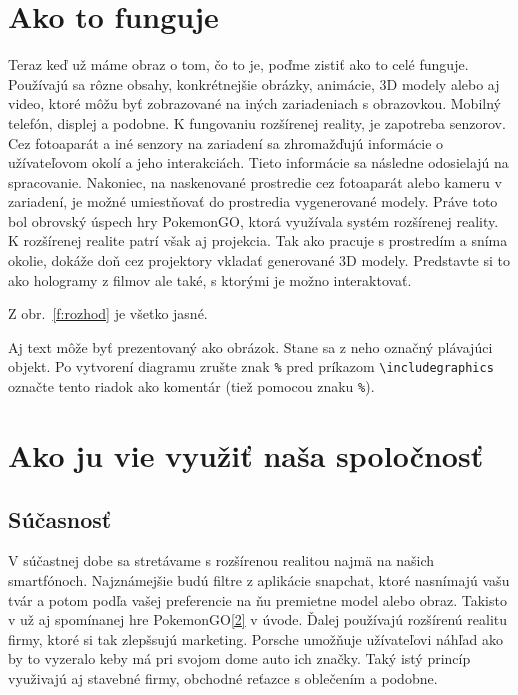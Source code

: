 \documentclass[10pt,twoside,slovak,a4paper]{article}
\begin{document}
\section{Ako to funguje}\label{3}

Teraz keď už máme obraz o tom, čo to je, poďme zistiť ako to celé funguje. Používajú sa rôzne obsahy, konkrétnejšie obrázky, animácie, 3D modely alebo aj video, ktoré môžu byť zobrazované na iných zariadeniach  s obrazovkou. Mobilný telefón, displej a podobne. K fungovaniu rozšírenej reality, je zapotreba senzorov. Cez fotoaparát a iné senzory na zariadení sa zhromažďujú informácie o užívateľovom okolí a jeho interakciách. Tieto informácie sa následne odosielajú na spracovanie. Nakoniec, na naskenované prostredie cez fotoaparát alebo kameru v zariadení, je možné umiestňovať do prostredia vygenerované modely. Práve toto bol obrovský úspech hry PokemonGO, ktorá využívala systém rozšírenej reality. K rozšírenej realite patrí však aj projekcia. Tak ako pracuje s prostredím a sníma okolie, dokáže doň cez projektory vkladať generované 3D modely. Predstavte si to ako hologramy z filmov ale také, s ktorými je možno interaktovať.

Z obr.~\ref{f:rozhod} je všetko jasné. 

\begin{figure*}[tbh]
\centering
Aj text môže byť prezentovaný ako obrázok. Stane sa z neho označný plávajúci objekt. Po vytvorení diagramu zrušte znak \texttt{\%} pred príkazom \verb|\includegraphics| označte tento riadok ako komentár (tiež pomocou znaku \texttt{\%}).
\caption{Rozhodujúci argument.}
\label{f:rozhod}
\end{figure*}



\section{Ako ju vie využiť naša spoločnosť} \label{4}
\subsection{Súčasnosť}\label{4:2}
V súčastnej dobe sa stretávame s rozšírenou realitou najmä na našich smartfónoch. Najznámejšie budú filtre z aplikácie snapchat, ktoré nasnímajú vašu tvár a potom podľa vašej preferencie na ňu premietne model alebo obraz. Takisto v už aj spomínanej hre PokemonGO\ref{2} v úvode. Ďalej používajú rozšírenú realitu firmy, ktoré si tak zlepšsujú marketing. Porsche umožňuje užívateľovi náhľad ako by to vyzeralo keby má pri svojom dome auto ich značky. Taký istý princíp využivajú aj stavebné firmy, obchodné reťazce s oblečením a podobne.
\end{document}
